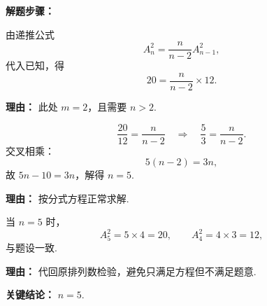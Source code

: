\begin{examplebox}
\textbf{\textcolor{CExample}{解题步骤：}}
\begin{description}[style=nextline, leftmargin=2.8em, labelsep=0.5em, itemsep=0.45em]
  \item[\textbf{第一步（建立方程）：}]
  由递推公式
  \[
    A_n^2=\frac{n}{n-2}A_{n-1}^2,
  \]
  代入已知，得
  \[
    20=\frac{n}{n-2}\times12.
  \]
  \par\textbf{理由：} 此处 $m=2$，且需要 $n>2$.

  \item[\textbf{第二步（解方程）：}]
  \[
    \frac{20}{12}=\frac{n}{n-2}
    \quad\Rightarrow\quad
    \frac{5}{3}=\frac{n}{n-2}.
  \]
  交叉相乘：
  \[
    5(n-2)=3n,
  \]
  故 $5n-10=3n$，解得 $n=5$.
  \par\textbf{理由：} 按分式方程正常求解.

  \item[\textbf{第三步（检验）：}]
  当 $n=5$ 时，
  \[
    A_5^2=5\times4=20,
    \qquad
    A_4^2=4\times3=12,
  \]
  与题设一致.
  \par\textbf{理由：} 代回原排列数检验，避免只满足方程但不满足题意.
\end{description}
\textbf{\textcolor{CExample}{关键结论：}} \textbf{$n=5$}.
\end{examplebox}
